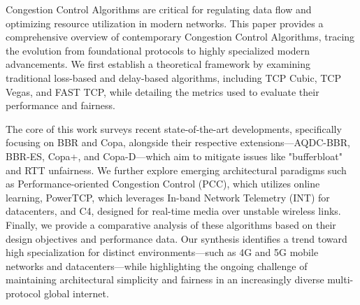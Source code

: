Congestion Control Algorithms are critical for regulating data flow and optimizing resource utilization in modern networks. 
This paper provides a comprehensive overview of contemporary Congestion Control Algorithms, tracing the evolution from foundational protocols to highly specialized modern advancements. 
We first establish a theoretical framework by examining traditional loss-based and delay-based algorithms, including TCP Cubic, TCP Vegas, and FAST TCP, while detailing the metrics used to evaluate their performance and fairness.  

The core of this work surveys recent state-of-the-art developments, specifically focusing on BBR and Copa, alongside their respective extensions—AQDC-BBR, BBR-ES, Copa+, and Copa-D—which aim to mitigate issues like "bufferbloat" and RTT unfairness. 
We further explore emerging architectural paradigms such as Performance-oriented Congestion Control (PCC), which utilizes online learning, PowerTCP, which leverages In-band Network Telemetry (INT) for datacenters, and C4, designed for real-time media over unstable wireless links. 
Finally, we provide a comparative analysis of these algorithms based on their design objectives and performance data. 
Our synthesis identifies a trend toward high specialization for distinct environments—such as 4G and 5G mobile networks and datacenters—while highlighting the ongoing challenge of maintaining architectural simplicity and fairness in an increasingly diverse multi-protocol global internet.
